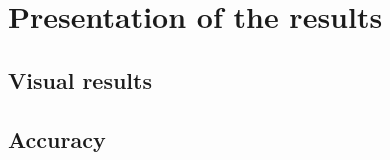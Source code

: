 
\chapter{Presentation of the results}\label{chapter:presentation_of_the_results}

\section{Visual results}
\section{Accuracy}